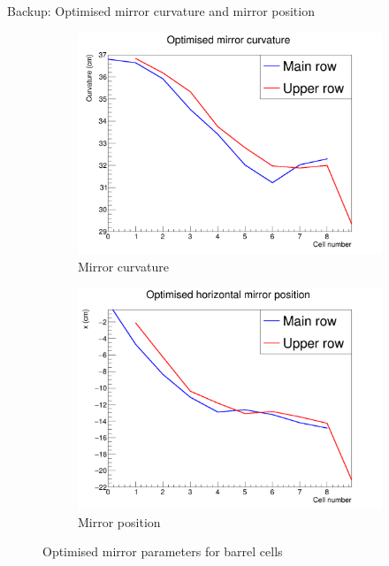 \documentclass{beamer}
\begin{document}
\begin{frame}{Backup: Optimised mirror curvature and mirror position}
  \begin{figure}
    \centering
    \vspace{-0.2cm}
    \begin{subfigure}{0.5\textwidth}
      \includegraphics[width = 1.0\textwidth]{Plots/OptimisedMirrorCurvature.png}
      \caption{Mirror curvature}
    \end{subfigure}%
    \begin{subfigure}{0.5\textwidth}
      \includegraphics[width = 1.0\textwidth]{Plots/OptimisedMirrorX.png}
      \caption{Mirror position}
    \end{subfigure}
    \caption{Optimised mirror parameters for barrel cells}
  \end{figure}
\end{frame}
\end{document}
